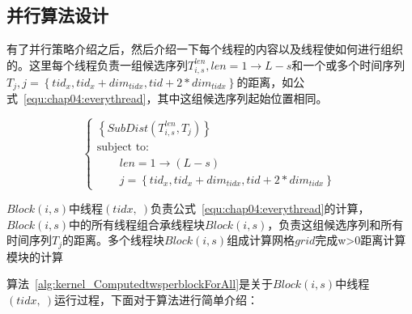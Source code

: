 \subsection{并行算法设计}

有了并行策略介绍之后，然后介绍一下每个线程的内容以及线程使如何进行组织的。这里每个线程负责一组候选序列$T_{i,s}^{len},len=1\to L-s$和一个或多个时间序列$T_j,j=\left\lbrace tid_x,tid_x+dim_{tidx},tid+2*dim_{tidx}\right\rbrace $的距离，如公式~\ref{equ:chap04:everythread}，其中这组候选序列起始位置相同。

\begin{equation}\label{equ:chap04:everythread}
\left\{\begin{array}{l}
\left\lbrace SubDist(T_{i,s}^{len},T_j) \right\rbrace \\[0.1cm]
\mbox{subject to:}\\[0.1cm]
\qquad len=1\to (L-s)\\[0.1cm]
\qquad j=\left\lbrace tid_x,tid_x+dim_{tidx},tid+2*dim_{tidx}\right\rbrace 
\end{array}\right.
\end{equation}

$Block(i,s)$中线程$(tidx,~)$负责公式~\ref{equ:chap04:everythread}的计算，$Block(i,s)$中的所有线程组合承线程块$Block(i,s)$，负责这组候选序列和所有时间序列$T_j$的距离。多个线程块$Block(i,s)$组成计算网格$grid$完成w>0距离计算模块的计算




算法~\ref{alg:kernel_ComputedtwsperblockForAll}是关于$Block(i,s)$中线程$(tidx,~)$运行过程，下面对于算法进行简单介绍：

